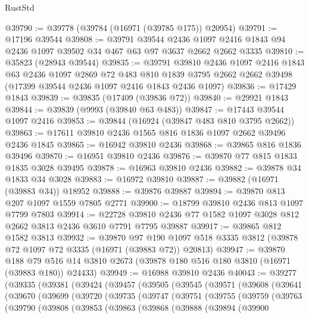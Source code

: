 \begin{lexlean}{RustStd}
\begin{coremodule}
@39790 := @39778 (@39784 (@16971 (@39785 @175)) @20954)
@39791 := @17196 @39544
@39808 := @39791
    @39544
    @2436
    @1097
    @2416
    @1843
    @94
    @2436
    @1097
    @39502
    @34
    @467
    @63
    @97
    @3637
    @2662
    @2662
    @3335
@39810 := @35823 (@28943 @39544)
@39835 := @39791
    @39810
    @2436
    @1097
    @2416
    @1843
    @63
    @2436
    @1097
    @2869
    @72
    @483
    @810
    @1839
    @3795
    @2662
    @2662
    @39498
    (@17399 @39544 @2436 @1097 @2416 @1843 @2436 @1097)
@39836 := @17429 @1843
@39839 := @39835 (@17409 (@39836 @72))
@39840 := @29921 @1843
@39844 := @39839 (@9993 (@39840 @63 @483))
@39847 := @17443 @39544 @1097 @2416
@39853 := @39844 (@16924 (@39847 @483 @810 @3795 @2662))
@39863 := @17611 @39810 @2436 @1565 @816 @1836 @1097 @2662 @39496 @2436 @1845
@39865 := @16942 @39810 @2436
@39868 := @39865 @816 @1836 @39496
@39870 := @16951 @39810 @2436
@39876 := @39870 @77 @815 @1833 @1835 @3028 @39495
@39878 := @16963 @39810 @2436
@39882 := @39878 @34 @1833 @34 @3028
@39883 := @16972 @39810
@39887 := @39882 (@16971 (@39883 @34)) @18952
@39888 := @39876 @39887
@39894 := @39870 @813 @207 @1097 @1559 @7805 @2771
@39900 := @18799 @39810 @2436 @813 @1097 @7799 @7803
@39914 := @22728 @39810 @2436 @77 @1582 @1097 @3028 @812 @2662 @3813 @2436 @3610 @7791 @7795 @39887
@39917 := @39865 @812 @1582 @3813
@39932 := @39870
    @97
    @190
    @1097
    @518
    @3335
    @3812
    (@39878 @72 @1097 @72 @3335 (@16971 (@39883 @72)) @20813)
@39947 := @39870
    @188
    @79
    @516
    @14
    @3810
    @2673
    (@39878 @180 @516 @180 @3810 (@16971 (@39883 @180)) @24433)
@39949 := @16988 @39810 @2436
@40043 := @39277
    (@39335
      (@39381
        (@39424
          (@39457
            (@39505
              (@39545
                (@39571
                  (@39608
                    (@39641
                      (@39670
                        (@39699
                          (@39720
                            (@39735
                              (@39747
                                (@39751
                                  (@39755
                                    (@39759
                                      (@39763
                                        (@39790
                                          (@39808
                                            (@39853
                                              (@39863
                                                (@39868
                                                  (@39888
                                                    (@39894
                                                      (@39900

\end{coremodule}
\end{lexlean}
